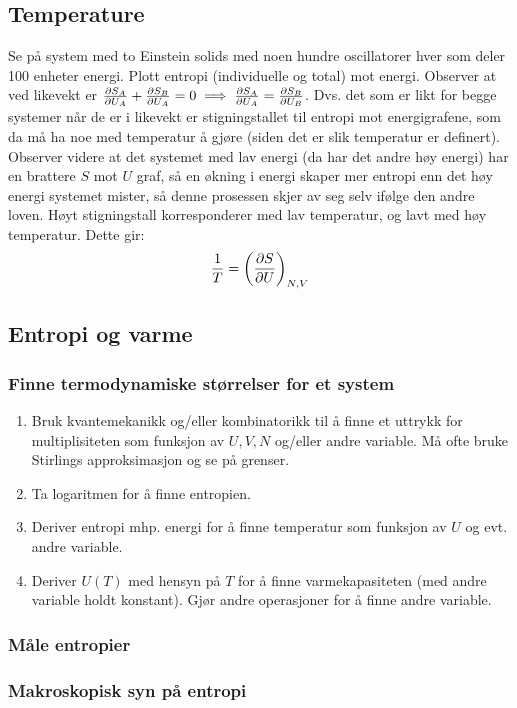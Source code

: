 \documentclass[12pt]{article}
\begin{document}
\subsection{Temperature}
Se på system med to Einstein solids med noen hundre oscillatorer hver som deler
100 enheter energi. Plott entropi (individuelle og total) mot energi. Observer at
ved likevekt er $\pdv{S_A}{U_A} + \pdv{S_B}{U_A} = 0 \implies \pdv{S_A}{U_A} = \pdv{S_B}{U_B}$.
Dvs. det som er likt for begge systemer når de er i likevekt er stigningstallet til
entropi mot energigrafene, som da må ha noe med temperatur å gjøre (siden det er slik
temperatur er definert). Observer videre at det systemet med lav energi (da har det andre høy energi)
har en brattere $S$ mot $U$ graf, så en økning i energi skaper mer entropi enn det
høy energi systemet mister, så denne prosessen skjer av seg selv ifølge den andre loven.
Høyt stigningstall korresponderer med lav temperatur, og lavt med høy temperatur. Dette gir:
\begin{align*}
  \frac{1}{T} = \left(\pdv{S}{U} \right)_{N,V}
\end{align*}
\subsection{Entropi og varme}
\subsubsection{Finne termodynamiske størrelser for et system}
\begin{enumerate}
  \itemsep0em
  \item Bruk kvantemekanikk og/eller kombinatorikk til å finne et uttrykk for
  multiplisiteten som funksjon av $U,V,N$ og/eller andre variable. Må ofte bruke
  Stirlings approksimasjon og se på grenser.
  \item Ta logaritmen for å finne entropien.
  \item Deriver entropi mhp. energi for å finne temperatur som funksjon av $U$
  og evt. andre variable.
  \item Deriver $U(T)$ med hensyn på $T$ for å finne varmekapasiteten (med andre
  variable holdt konstant). Gjør andre operasjoner for å finne andre variable.
\end{enumerate}
\subsubsection{Måle entropier}
\subsubsection{Makroskopisk syn på entropi}
\end{document}
